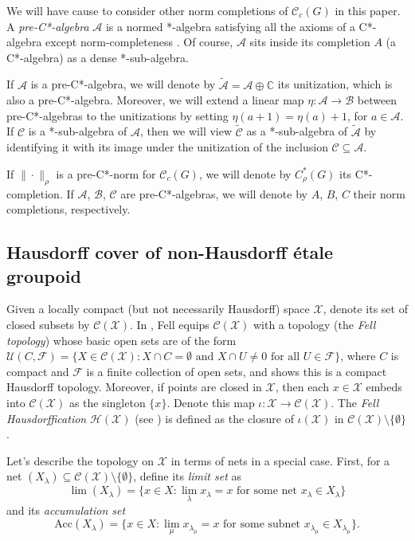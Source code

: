 \documentclass[a4paper, 12pt]{amsart}
\theoremstyle{definition}
\theoremstyle{remark}
\numberwithin{equation}{section}
\begin{document}
We will have cause to consider other norm completions of $\mathscr{C}_{c}(G)$ in this paper. A \emph{pre-C*-algebra} $\mathcal{A}$ is a normed *-algebra satisfying all the axioms of a C*-algebra except norm-completeness \cite{Lance}. Of course, $\mathcal{A}$ sits inside its completion $A$ (a C*-algebra) as a dense *-sub-algebra. 

If $\mathcal{A}$ is a pre-C*-algebra, we will denote by $\tilde{\mathcal{A}} = \mathcal{A}\oplus\mathbb{C}$ its unitization, which is also a pre-C*-algebra. Moreover, we will extend a linear map $\eta:\mathcal{A}\to \mathcal{B}$ between pre-C*-algebras to the unitizations by setting $\eta(a + 1) = \eta(a) + 1$, for $a\in\mathcal{A}$. If $\mathcal{C}$ is a *-sub-algebra of $\mathcal{A}$, then we will view $\tilde{\mathcal{C}}$ as a *-sub-algebra of $\tilde{\mathcal{A}}$ by identifying it with its image under the unitization of the inclusion $\mathcal{C}\subseteq \mathcal{A}$.

If $\|\cdot\|_{\rho}$ is a pre-C*-norm for $\mathscr{C}_{c}(G)$, we will denote by $C^{*}_{\rho}(G)$ its C*-completion. If $\mathcal{A}$, $\mathcal{B}$, $\mathcal{C}$ are pre-C*-algebras, we will denote by $A$, $B$, $C$ their norm completions, respectively.


\subsection{Hausdorff cover of non-Hausdorff \'etale groupoid}
\label{ss:cover}

Given a locally compact (but not necessarily Hausdorff) space $\mathcal{X}$, denote its set of closed subsets by $\mathcal{C}(\mathcal{X})$. In \cite{F62}, Fell equips $\mathcal{C}(\mathcal{X})$ with a topology (the \emph{Fell topology}) whose basic open sets are of the form $\mathcal{U}(C,\mathcal{F}) = \{X\in\mathcal{C}(\mathcal{X}): X\cap C = \emptyset\text{ and } X\cap U\neq 0\text{ for all }U\in\mathcal{F}\}$, where $C$ is compact and $\mathcal{F}$ is a finite collection of open sets, and shows this is a compact Hausdorff topology. Moreover, if points are closed in $\mathcal{X}$, then each $x\in \mathcal{X}$ embeds into $\mathcal{C}(\mathcal{X})$ as the singleton $\{x\}$. Denote this map $\iota:\mathcal{X}\to\mathcal{C}(\mathcal{X})$. The \emph{Fell Hausdorffication} $\mathcal{H}(\mathcal{X})$ (see \cite{F62}) is defined as the closure of $\iota(\mathcal{X})$ in $\mathcal{C}(\mathcal{X})\setminus \{\emptyset\}$.

Let's describe the topology on $\mathcal{X}$ in terms of nets in a special case. First, for a net $(X_{\lambda})\subseteq \mathcal{C}(\mathcal{X})\setminus \{\emptyset\}$, define its \emph{limit set} as $$\lim(X_{\lambda}) = \{x\in X: \lim_{\lambda} x_{\lambda} = x\text{ for some net }x_{\lambda}\in X_{\lambda}\}$$ and its \emph{accumulation set}
$$\text{Acc}(X_{\lambda}) = \{x\in X: \lim_{\mu} x_{\lambda_{\mu}} = x\text{ for some subnet } x_{\lambda_{\mu}}\in X_{\lambda_{\mu}}\}.$$
\end{document}
